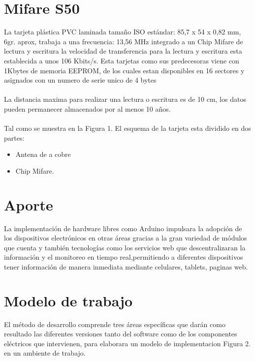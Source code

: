 \documentclass[11pt,twocolumn]{article}
\begin{document}
\section{Mifare S50}

La tarjeta plástica PVC laminada tamaño ISO estándar: 85,7 x 54 x 0,82 mm, 6gr. aprox, trabaja a una frecuencia: 13,56 MHz integrado a un Chip Mifare de lectura y escritura la velocidad de transferencia para la lectura y escritura esta establecida a unos 106 Kbits/s. Esta tarjetas como sus predecesoras viene  con 1Kbytes de memoria EEPROM, de los cuales estan disponibles en 16 sectores y asignados con un numero de serie unico de 4 bytes\\
\\
La distancia maxima para realizar una lectura o escritura es de 10 cm, los datos pueden permanecer almacenados por al menos 10 a\~nos. \\
\\
Tal como se muestra en la Figura 1. El esquema de la tarjeta esta dividido en dos partes:\\

\begin{itemize}
	\item Antena de a cobre
	\item Chip Mifare.
\end{itemize}

\section{Aporte}

La implementaci\'on de hardware libres como Arduino impulsara la adopci\'on de los dispositivos electr\'onicos en otras \'areas gracias a la gran variedad de m\'odulos que cuenta y tambi\'en tecnolog\'ias como los servicios web que descentralizaran la informaci\'on y el monitoreo en tiempo real,permitiendo a diferentes dispositivos tener informaci\'on de manera inmediata mediante   celulares, tablets, paginas web.

\section{Modelo de trabajo}  

El m\'etodo de desarrollo comprende tres \'areas espec\'ificas que dar\'an como resultado las diferentes versiones tanto del software como de los componentes el\'ectricos  que intervienen, para elaborara un modelo de implementacion Figura 2. en un ambiente de trabajo.\\
\end{document}
